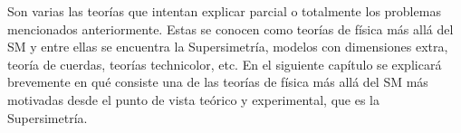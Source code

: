 
Son varias las teorías que intentan explicar parcial o totalmente los problemas
mencionados anteriormente. Estas se conocen como teorías de física más allá del SM y entre
ellas se encuentra la Supersimetría, modelos con dimensiones extra, teoría de
cuerdas, teorías technicolor, etc. En el siguiente capítulo se explicará brevemente
en qué consiste una de las teorías de física más allá del SM más motivadas desde
el punto de vista teórico y experimental, que es la Supersimetría.
